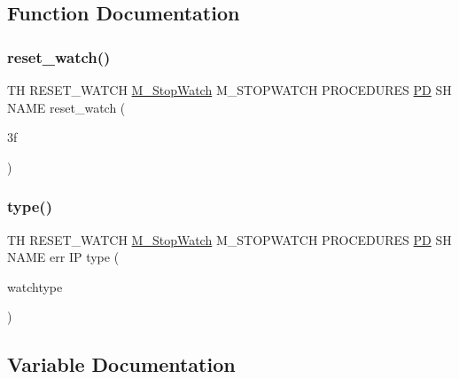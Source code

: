 \subsection{Function Documentation}
\mbox{\label{reset__watch_83_8txt_a8979fe90312513c8e2e928e5b426d683}} 
\subsubsection{\texorpdfstring{reset\+\_\+watch()}{reset\_watch()}}
{\footnotesize\ttfamily TH R\+E\+S\+E\+T\+\_\+\+W\+A\+T\+CH \hyperlink{option__stopwatch_83_8txt_aa2011fc45a5e502e87ee50996a8a9305}{M\+\_\+\+Stop\+Watch} M\+\_\+\+S\+T\+O\+P\+W\+A\+T\+CH P\+R\+O\+C\+E\+D\+U\+R\+ES \hyperlink{what__overview_81_8txt_a85f26da5a4481fbdb0d9c79f2b94de3e}{PD} SH N\+A\+ME reset\+\_\+watch (\begin{DoxyParamCaption}\item[{3f}]{ }\end{DoxyParamCaption})}

\mbox{\label{reset__watch_83_8txt_a69ae41268dbeb10a64f113e549021710}} 
\subsubsection{\texorpdfstring{type()}{type()}}
{\footnotesize\ttfamily TH R\+E\+S\+E\+T\+\_\+\+W\+A\+T\+CH \hyperlink{option__stopwatch_83_8txt_aa2011fc45a5e502e87ee50996a8a9305}{M\+\_\+\+Stop\+Watch} M\+\_\+\+S\+T\+O\+P\+W\+A\+T\+CH P\+R\+O\+C\+E\+D\+U\+R\+ES \hyperlink{what__overview_81_8txt_a85f26da5a4481fbdb0d9c79f2b94de3e}{PD} SH N\+A\+ME err IP type (\begin{DoxyParamCaption}\item[{watchtype}]{ }\end{DoxyParamCaption})}



\subsection{Variable Documentation}
\mbox{\label{reset__watch_83_8txt_a6edaf77670f85062a402406bd5a409b1}} 
